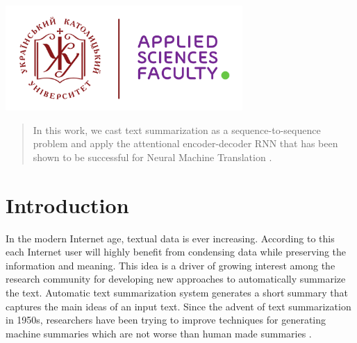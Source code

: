\begin{titlepage}

\includegraphics[height=4cm]{img/UCU-Apps.png}\\[1cm] %
 

\vfill %

\end{titlepage}


\begin{abstract}
In this work, we cast text summarization as a sequence-to-sequence problem and apply the attentional encoder-decoder RNN that has been shown to be successful for Neural Machine Translation \cite{baseline_NMT}.
\end{abstract}

\section{Introduction}

In the modern Internet age, textual data is ever increasing. According to this each Internet user will highly benefit from condensing data while preserving the information and meaning. This idea is a driver of growing interest among the research community for developing new approaches to automatically summarize the text. Automatic text summarization system generates a short summary that captures the main ideas
of an input text. Since the advent of text summarization in 1950s, researchers have been trying to improve techniques for generating machine summaries which are not worse than human made summaries \cite{text_sum_survey}.
  
